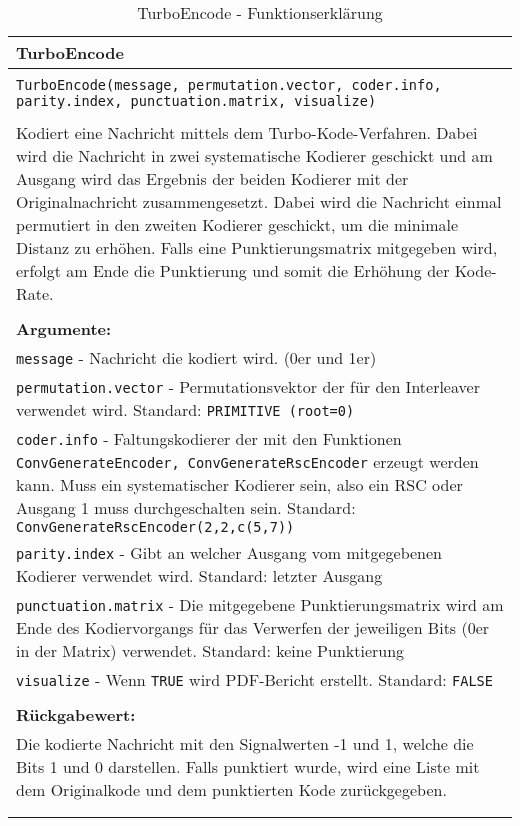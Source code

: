 \begin{longtable}{|p{\textwidth}|}
\hline
\rowcolor{lightblue}TurboEncode\\
\hline
\\
\texttt{TurboEncode(message, permutation.vector, coder.info, parity.index, punctuation.matrix, visualize)}\\
\\
Kodiert eine Nachricht mittels dem Turbo-Kode-Verfahren. Dabei wird die Nachricht in zwei systematische Kodierer geschickt und am Ausgang wird das Ergebnis der beiden Kodierer mit der Originalnachricht zusammengesetzt. Dabei wird die Nachricht einmal permutiert in den zweiten Kodierer geschickt, um die minimale Distanz zu erhöhen. Falls eine Punktierungsmatrix mitgegeben wird, erfolgt am Ende die Punktierung und somit die Erhöhung der Kode-Rate.\\
\\
\textbf{Argumente:}\\
\texttt{message} - Nachricht die kodiert wird. (0er und 1er)\\
\texttt{permutation.vector} - Permutationsvektor der für den Interleaver verwendet wird. Standard: \texttt{PRIMITIVE (root=0)}\\
\texttt{coder.info} - Faltungskodierer der mit den Funktionen \texttt{ConvGenerateEncoder, ConvGenerateRscEncoder} erzeugt werden kann. Muss ein systematischer Kodierer sein, also ein RSC oder Ausgang 1 muss durchgeschalten sein. Standard: \texttt{ConvGenerateRscEncoder(2,2,c(5,7))}\\
\texttt{parity.index} - Gibt an welcher Ausgang vom mitgegebenen Kodierer verwendet wird. Standard: letzter Ausgang\\
\texttt{punctuation.matrix} - Die mitgegebene Punktierungsmatrix wird am Ende des Kodiervorgangs für das Verwerfen der jeweiligen Bits (0er in der Matrix) verwendet. Standard: keine Punktierung\\
\texttt{visualize} - Wenn \texttt{TRUE} wird PDF-Bericht erstellt. Standard: \texttt{FALSE}\\
\\
\textbf{Rückgabewert:}\\
Die kodierte Nachricht mit den Signalwerten -1 und 1, welche die Bits 1 und 0 darstellen. Falls punktiert wurde, wird eine Liste mit dem Originalkode und dem punktierten Kode zurückgegeben.\\
\\
\hline
\caption[TurboEncode]{TurboEncode - Funktionserklärung}
\end{longtable}